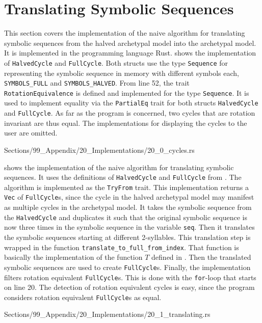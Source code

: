 \section{Translating Symbolic Sequences}

This section covers the implementation of the naive algorithm for translating symbolic sequences from the halved archetypal model into the archetypal model.
It is implemented in the programming language Rust.
 shows the implementation of \texttt{HalvedCycle} and \texttt{FullCycle}.
Both structs use the type \texttt{Sequence} for representing the symbolic sequence in memory with different symbols each, \texttt{SYMBOLS\_FULL} and \texttt{SYMBOLS\_HALVED}.
From line 52, the trait \texttt{RotationEquivalence} is defined and implemented for the type \texttt{Sequence}.
It is used to implement equality via the \texttt{PartialEq} trait for both structs \texttt{HalvedCycle} and \texttt{FullCycle}.
As far as the program is concerned, two cycles that are rotation invariant are thus equal.
The implementations for displaying the cycles to the user are omitted.


{Sections/99_Appendix/20_Implementations/20_0_cycles.rs}

\clearpage
{} shows the implementation of the naive algorithm for translating symbolic sequences.
It uses the definitions of \texttt{HalvedCycle} and \texttt{FullCycle} from .
The algorithm is implemented as the \texttt{TryFrom} trait.
This implementation returns a \texttt{Vec} of \texttt{FullCycle}s, since the cycle in the halved archetypal model may manifest as multiple cycles in the archetypal model.
It takes the symbolic sequence from the \texttt{HalvedCycle} and duplicates it such that the original symbolic sequence is now three times in the symbolic sequence in the variable \texttt{seq}.
Then it translates the symbolic sequences starting at different 2-syllables.
This translation step is wrapped in the function \texttt{translate\_to\_full\_from\_index}.
That function is basically the implementation of the function $T$ defined in .
Then the translated symbolic sequences are used to create \texttt{FullCycle}s.
Finally, the implementation filters rotation equivalent \texttt{FullCycle}s.
This is done with the \texttt{for}-loop that starts on line 20.
The detection of rotation equivalent cycles is easy, since the program considers rotation equivalent \texttt{FullCycle}s as equal.



{Sections/99_Appendix/20_Implementations/20_1_translating.rs}
